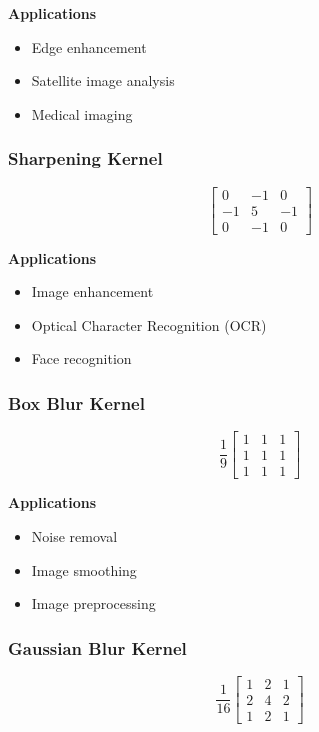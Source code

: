\documentclass[12pt,a4paper]{article}
\begin{document}
\textbf{Applications}

\begin{itemize}
    \item Edge enhancement
    \item Satellite image analysis
    \item Medical imaging
\end{itemize}

\subsubsection{Sharpening Kernel}

\[
\begin{bmatrix}
0 & -1 & 0\\
-1 & 5 & -1\\
0 & -1 & 0
\end{bmatrix}
\]

\textbf{Applications}

\begin{itemize}
    \item Image enhancement
    \item Optical Character Recognition (OCR)
    \item Face recognition
\end{itemize}

\subsubsection{Box Blur Kernel}

\[
\frac{1}{9}
\begin{bmatrix}
1&1&1\\
1&1&1\\
1&1&1
\end{bmatrix}
\]

\textbf{Applications}

\begin{itemize}
    \item Noise removal
    \item Image smoothing
    \item Image preprocessing
\end{itemize}

\subsubsection{Gaussian Blur Kernel}

\[
\frac{1}{16}
\begin{bmatrix}
1&2&1\\
2&4&2\\
1&2&1
\end{bmatrix}
\]
\end{document}
